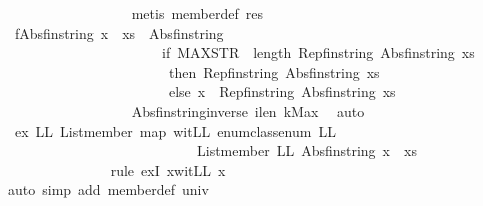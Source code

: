 \begin{isabellebody}
\ \ \ \ \ \ \ \ \ \ \ \ \ \ \ \ \isamarkupfalse%
\ {\isacharparenleft}metis\ member{\isacharunderscore}def\ res{\isacharparenright}\isanewline
\ \ \ \ \ \ \ \ \ \ \ \ \isamarkupfalse%
\ f{}{\isacharcolon}{\isachardoublequoteopen}Abs{\isacharunderscore}fin{\isacharunderscore}string\ {\isacharparenleft}x\ {\isacharhash}\ xs{\isacharparenright}\ {\isacharequal}\ Abs{\isacharunderscore}fin{\isacharunderscore}string\ \isanewline
\ \ \ \ \ \ \ \ \ \ \ \ \ \ \ \ \ \ \ \ \ \ {\isacharparenleft}if\ MAX{\isacharunderscore}STR\ {\isasymle}\ length\ {\isacharparenleft}Rep{\isacharunderscore}fin{\isacharunderscore}string\ {\isacharparenleft}Abs{\isacharunderscore}fin{\isacharunderscore}string\ xs{\isacharparenright}{\isacharparenright}\ \isanewline
\ \ \ \ \ \ \ \ \ \ \ \ \ \ \ \ \ \ \ \ \ \ \ then\ Rep{\isacharunderscore}fin{\isacharunderscore}string\ {\isacharparenleft}Abs{\isacharunderscore}fin{\isacharunderscore}string\ xs{\isacharparenright}\isanewline
\ \ \ \ \ \ \ \ \ \ \ \ \ \ \ \ \ \ \ \ \ \ \ else\ x\ {\isacharhash}\ Rep{\isacharunderscore}fin{\isacharunderscore}string\ {\isacharparenleft}Abs{\isacharunderscore}fin{\isacharunderscore}string\ xs{\isacharparenright}{\isacharparenright}{\isachardoublequoteclose}\isanewline
\ \ \ \ \ \ \ \ \ \ \ \ \ \ \ \ \isamarkupfalse%
\ Abs{\isacharunderscore}fin{\isacharunderscore}string{\isacharunderscore}inverse\ ilen\ kMax\ \isamarkupfalse%
\ auto\isanewline
\ \ \ \ \ \ \ \ \ \ \ \ \isamarkupfalse%
\ ex{\isacharcolon}{\isachardoublequoteopen}{\isasymexists}\ LL{\isachardot}\ {\isacharparenleft}List{\isachardot}member\ {\isacharparenleft}map\ {\isacharquery}witLL\ enum{\isacharunderscore}class{\isachardot}enum{\isacharparenright}\ LL{\isacharparenright}\ \isanewline
\ \ \ \ \ \ \ \ \ \ \ \ \ \ \ \ \ \ \ \ \ \ \ \ \ \ {\isasymand}\ List{\isachardot}member\ LL\ {\isacharparenleft}Abs{\isacharunderscore}fin{\isacharunderscore}string\ {\isacharparenleft}x\ {\isacharhash}\ xs{\isacharparenright}{\isacharparenright}{\isachardoublequoteclose}\isanewline
\ \ \ \ \ \ \ \ \ \ \ \ \ \ \isamarkupfalse%
{\isacharparenleft}rule\ exI{\isacharbrackleft}\ x{\isacharequal}{\isachardoublequoteopen}{\isacharquery}witLL\ x{\isachardoublequoteclose}{\isacharbrackright}{\isacharparenright}\isanewline
\ \ \ \ \ \ \ \ \ \ \ \ \ \ \isamarkupfalse%
{\isacharparenleft}auto\ simp\ add{\isacharcolon}\ member{\isacharunderscore}def\ univ{\isacharparenright}\isanewline
\ \ \ \ \ \ \ \ \ \ \ \ \ \ \isamarkupfalse%

\end{isabellebody}
